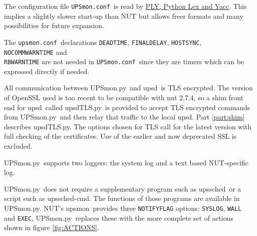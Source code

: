 \documentclass[12pt]{article}
\newcommand{\upsd}{\mbox{\textcolor{UPSDCOLOUR}{upsd}}}
\newcommand{\upsmon}{\mbox{\textcolor{MONCOLOUR}{upsmon}}}
\newcommand{\upssched}{\mbox{\textcolor{SCHEDCOLOUR}{upssched}}}
\newcommand{\upsschedcmd}{\mbox{\textcolor{CMDCOLOUR}{upssched-cmd}}}
\newcommand{\upsdTLS}{\mbox{\textcolor{UPSDCOLOUR}{upsdTLS.py}}}
\newcommand{\UPSmon}{\mbox{\textcolor{UPSMONCOLOUR}{UPSmon.py}}}
\newcommand{\upsmonconf}{\textcolor{MONCOLOUR}{\texttt{upsmon.conf}}}
\newcommand{\UPSmonconf}{\textcolor{UPSMONCOLOUR}{\texttt{UPSmon.conf}}}
\newcommand{\li}{\item}                 %
\begin{document}
\li The configuration file \UPSmonconf\ is read by
\href{https://www.dabeaz.com/ply/}{PLY, Python Lex and Yacc}.  This implies
a slightly slower start-up than NUT but allows freer formats and many
possibilities for future expansion.

\li The \upsmonconf\ declarations \texttt{DEADTIME}, \texttt{FINALDELAY},
\texttt{HOSTSYNC}, \texttt{NOCOMMWARNTIME} and \\ \texttt{RBWARNTIME} are not
needed in \UPSmonconf\ since they are timers which can be expressed directly
if needed.

\li All communication between \UPSmon\ and \upsd\ is TLS encrypted. The
version of OpenSSL used is too recent to be compatible with nut 2.7.4, so a
shim front end for \upsd\ called \upsdTLS\ is provided to accept TLS encrypted
commands from \UPSmon\ and then relay that traffic to the local \upsd.  Part
\ref{part:shim} describes \upsdTLS.  The options chosen for TLS call for the
latest version with full checking of the certificates.  Use of the earlier and
now deprecated SSL is excluded.

\li \UPSmon\ supports two loggers: the system log and a text based
NUT-specific log.

\li \UPSmon\ does not require a supplementary program such as \upssched\ or a
script such as \upsschedcmd.  The functions of those programs are available in
\UPSmon.  NUT's \upsmon\ provides three \texttt{NOTIFYFLAG} options:
\texttt{SYSLOG}, \texttt{WALL} and \texttt{EXEC}, \UPSmon\ replaces these with
the more complete set of actions shown in figure \ref{fig:ACTIONS}.
\end{document}

